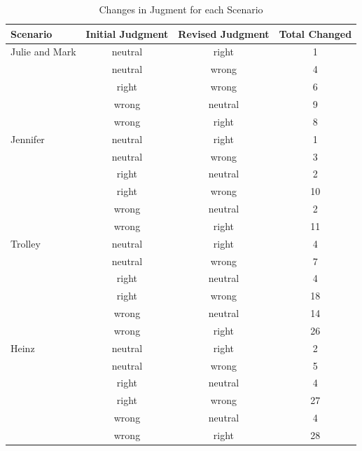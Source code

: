 \documentclass[
  man,floatsintext]{apa6}
\begin{document}
\begin{table}[tbp]

\begin{center}
\begin{threeparttable}

\caption{\label{tab:tabS6changeeachscenario}Changes in Jugment for each Scenario}

\begin{tabular}{lccc}
\toprule
Scenario & \multicolumn{1}{c}{Initial Judgment} & \multicolumn{1}{c}{Revised Judgment} & \multicolumn{1}{c}{Total Changed}\\
\midrule
Julie and Mark & neutral & right & 1\\
 & neutral & wrong & 4\\
 & right & wrong & 6\\
 & wrong & neutral & 9\\
 & wrong & right & 8\\
Jennifer & neutral & right & 1\\
 & neutral & wrong & 3\\
 & right & neutral & 2\\
 & right & wrong & 10\\
 & wrong & neutral & 2\\
 & wrong & right & 11\\
Trolley & neutral & right & 4\\
 & neutral & wrong & 7\\
 & right & neutral & 4\\
 & right & wrong & 18\\
 & wrong & neutral & 14\\
 & wrong & right & 26\\
Heinz & neutral & right & 2\\
 & neutral & wrong & 5\\
 & right & neutral & 4\\
 & right & wrong & 27\\
 & wrong & neutral & 4\\
 & wrong & right & 28\\
\bottomrule
\end{tabular}

\end{threeparttable}
\end{center}

\end{table}
\end{document}
